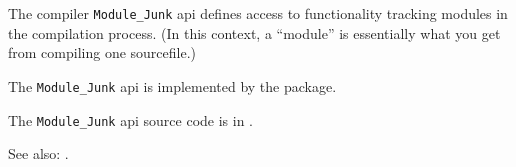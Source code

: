 
The compiler {\tt Module\_Junk} api defines access to functionality tracking modules 
in the compilation process.    (In this context, a ``module'' is essentially what you get from 
compiling one sourcefile.)

The {\tt Module\_Junk} api is implemented by the  package.

The {\tt Module\_Junk} api source code is in .

See also:  .


